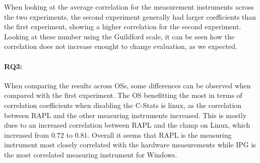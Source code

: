 When looking at the average correlation for the measurement instruments across the two experiments, the second experiment generally had larger coefficients than the first experiment, showing a higher correlation for the second experiment. Looking at these number using the Guildford scale, it can be seen how the correlation does not increase enought to change evaluation, as we expected.

\paragraph{RQ3:} When comparing the results across OSs, some differences can be observed when compared with the first experiment. The OS benefitting the most in terms of correlation coefficients when disabling the C-Stats is linux, as the correlation between RAPL and the other measuring instruments increased. This is mostly dues to an increased correlation between RAPL and the clamp on Linux, which increased from $0.72$ to $0.81$.  Overall it seems that RAPL is the measuring instrument most closely correlated with the hardware measurements while IPG is the most correlated measuring instrument for Windows.





%  


% 

